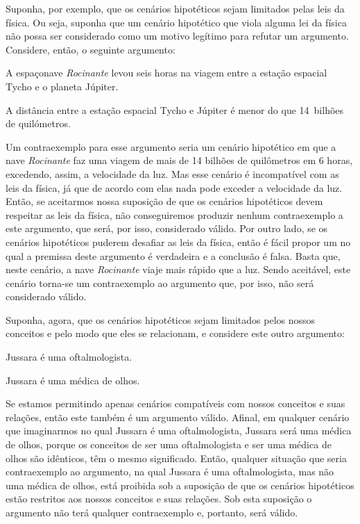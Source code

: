 Suponha, por exemplo, que os cenários hipotéticos sejam limitados pelas leis da física.
Ou seja, suponha que um cenário hipotético que viola alguma lei da física não possa ser considerado como um motivo legítimo para refutar um argumento.
Considere, então, o seguinte argumento:
	\begin{earg}
		\item[] A espaçonave \emph{Rocinante} levou seis horas na viagem entre a estação espacial Tycho e o planeta Júpiter.
		\item[\therefore] A distância entre a estação espacial Tycho e Júpiter é menor do que 14~bilhões de quilómetros.
	\end{earg}
Um contraexemplo para esse argumento seria um cenário hipotético em que a nave \emph{Rocinante} faz uma viagem de mais de 14 bilhões de quilômetros em 6 horas, excedendo, assim, a velocidade da luz.
Mas esse cenário é incompatível com as leis da física, já que de acordo com elas nada pode exceder a velocidade da luz.
Então, se aceitarmos nossa suposição de que os cenários hipotéticos devem respeitar as leis da física, não conseguiremos produzir nenhum contraexemplo a este argumento, que será, por isso, considerado válido.
Por outro lado, se os cenários hipotéticos puderem desafiar as leis da física, então é fácil propor um no qual a premissa deste argumento é verdadeira e a conclusão é falsa.
Basta que, neste cenário, a nave \emph{Rocinante} viaje mais rápido que a luz.
Sendo aceitável, este cenário torna-se um contraexemplo ao argumento que, por isso, não será considerado válido.	

Suponha, agora, que os cenários hipotéticos sejam limitados pelos nossos conceitos e pelo modo que eles se relacionam, e considere este outro argumento:
	\begin{earg}
		\item[] Jussara é uma oftalmologista.
		\item[\therefore] Jussara é uma médica de olhos.
	\end{earg}
Se estamos permitindo apenas cenários compatíveis com nossos conceitos e suas relações, então este também é um argumento válido.
Afinal, em qualquer cenário que imaginarmos no qual Jussara é uma oftalmologista, Jussara será uma médica de olhos, porque os conceitos de ser uma oftalmologista e ser uma médica de olhos são idênticos, têm o mesmo significado.
Então, qualquer situação que seria contraexemplo ao argumento, na qual Jussara é uma oftalmologista, mas não uma médica de olhos, está proibida sob a suposição de que os cenários hipotéticos estão restritos aos nossos conceitos e suas relações.
Sob esta suposição o argumento não terá qualquer contraexemplo e, portanto, será válido.

